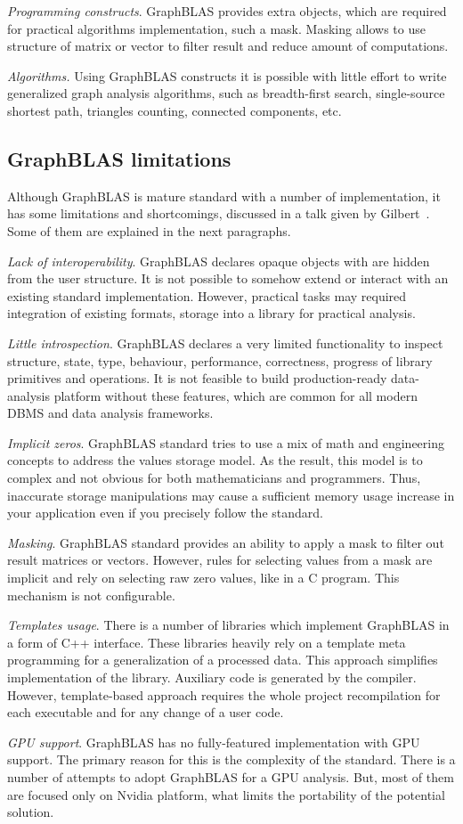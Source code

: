 \textit{Programming constructs}. GraphBLAS provides extra objects, which are required for practical algorithms implementation, such a mask. Masking allows to use structure of matrix or vector to filter result and reduce amount of computations.

\textit{Algorithms.} Using GraphBLAS constructs it is possible with little effort to write generalized graph analysis algorithms, such as breadth-first search, single-source shortest path, triangles counting, connected components, etc.

\subsection{GraphBLAS limitations}

Although GraphBLAS is mature standard with a number of implementation, it has some limitations and shortcomings, discussed in a talk given by Gilbert~\cite{talk:graphblas_did_wrong}. Some of them are explained in the next paragraphs. 

\textit{Lack of interoperability}. GraphBLAS declares opaque objects with are hidden from the user structure. It is not possible to somehow extend or interact with an existing standard implementation. However, practical tasks may required integration of existing formats, storage into a library for practical analysis. 

\textit{Little introspection}. GraphBLAS declares a very limited functionality to inspect structure, state, type, behaviour, performance, correctness, progress of library primitives and operations. It is not feasible to build production-ready data-analysis platform without these features, which are common for all modern DBMS and data analysis frameworks.

\textit{Implicit zeros}. GraphBLAS standard tries to use a mix of math and engineering concepts to address the values storage model. As the result, this model is to complex and not obvious for both mathematicians and programmers. Thus, inaccurate storage manipulations may cause a sufficient memory usage increase in your application even if you precisely follow the standard.

\textit{Masking}. GraphBLAS standard provides an ability to apply a mask to filter out result matrices or vectors. However, rules for selecting values from a mask are implicit and rely on selecting raw zero values, like in a C program. This mechanism is not configurable.

\textit{Templates usage}. There is a number of libraries which implement GraphBLAS in a form of C++ interface. These libraries heavily rely on a template meta programming for a generalization of a processed data. This approach simplifies implementation of the library. Auxiliary code is generated by the compiler. However, template-based approach requires the whole project recompilation for each executable and for any change of a user code.

\textit{GPU support}. GraphBLAS has no fully-featured implementation with GPU support. The primary reason for this is the complexity of the standard. There is a number of attempts to adopt GraphBLAS for a GPU analysis. But, most of them are focused only on Nvidia platform, what limits the portability of the potential solution.